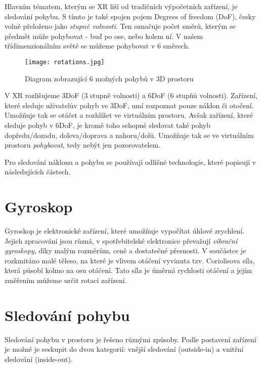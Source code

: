 Hlavním tématem, kterým se XR liší od tradičních výpočetních zařízení, je sledování pohybu. S tímto je také spojen pojem Degrees of freedom (DoF), česky volně přeloženo jako \textit{stupně volnosti}. Ten označuje počet směrů, kterým se předmět může pohybovat - buď po ose, nebo kolem ní. V našem třídimenzionálním světě se můžeme pohybovat v 6 směrech. \cite{mechatech_3dof_6dof}

\begin{figure}[H]
    \centering
    \texttt{[image: rotations.jpg]}
    \caption{Diagram zobrazující 6 možných pohybů v 3D prostoru \cite{nasa_aircraft}}
    \label{rotations_nasa_fig}
\end{figure}

V XR rozlišujeme 3DoF (3 stupně volnosti) a 6DoF (6 stupňů volnosti). Zařízení, které sleduje uživatelův pohyb ve 3DoF, umí rozpoznat pouze náklon či otočení. Umožňuje tak se otáčet a rozhlížet ve virtuálním prostoru. Avšak zařízení, které sleduje pohyb v 6DoF, je kromě toho schopné sledovat také pohyb dopředu/dozadu, doleva/doprava a nahoru/dolů. Umožňuje tak se ve virtuálním prostoru \textit{pohybovat}, tedy nebýt jen pozorovatelem. \cite{mechatech_3dof_6dof}

Pro sledování náklonu a pohybu se používají odlišné technologie, které popisuji v následujících částech.

\section{Gyroskop}

Gyroskop je elektronické zařízení, které umožňuje vypočítat úhlové zrychlení. Jejich zpracování jsou různá, v spotřebitelské elektronice převažují \textit{vibrační gyroskopy}, díky malým rozměrům, ceně a dostatečné přesnosti. V součástce je rozkmitáno malé těleso, na které je vlivem otáčení vyvinuta tzv. Coriolisova síla, která působí kolmo na osu otáčení. Tato síla je úměrná rychlosti otáčení a jejím změřením můžeme určit rotaci zařízení. \cite{Electricity_Magnetism} \cite{techmania_coriolis}

\section{Sledování pohybu}

Sledování pohybu v prostoru je řešeno různými způsoby. Podle postavení zařízení je možné je seskupit do dvou kategorií: vnější sledování (outside-in) a vnitřní sledování (inside-out).

